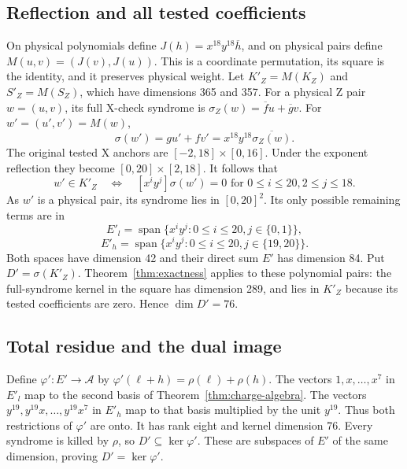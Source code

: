 \documentclass{article}
\DeclareMathOperator{\Span}{span}
\begin{document}
\subsection{Reflection and all tested coefficients}\label{sec:z-reflection}

On physical polynomials define \(J(h) = x^{18} y^{18} \overline{h}\), and on physical pairs
define \(M(u,v) = (J(v), J(u))\). This is a coordinate permutation, its square is the
identity, and it preserves physical weight. Let \(K'_Z = M(K_Z)\) and \(S'_Z = M(S_Z)\),
which have dimensions 365 and 357. For a physical Z pair \(w = (u, v)\), its full X-check
syndrome is \(\sigma_Z(w) = \overline{f} u + \overline{g} v\). For \(w' = (u', v') = M(w)\),
\begin{equation}
  \sigma(w') = gu' + fv' = x^{18} y^{18} \overline{\sigma_Z(w)}.
\end{equation}
The original tested X anchors are \([-2,18] \times [0,16]\). Under the exponent reflection
they become \([0,20] \times [2,18]\). It follows that
\begin{equation}
  w' \in K'_Z \quad \Longleftrightarrow \quad
  [x^i y^j]\sigma(w') = 0
  \text{ for } 0 \le i \le 20, 2 \le j \le 18.
\end{equation}
As \(w'\) is a physical pair, its syndrome lies in \([0,20]^2\). Its only possible remaining
terms are in
\begin{equation}
  E'_l = \Span\{x^i y^j : 0 \le i \le 20, j \in \{0,1\}\},
\end{equation}
\begin{equation}
  E'_h = \Span\{x^i y^j : 0 \le i \le 20, j \in \{19,20\}\}.
\end{equation}
Both spaces have dimension 42 and their direct sum \(E'\) has dimension 84. Put
\(D' = \sigma(K'_Z)\). Theorem~\ref{thm:exactness} applies to these polynomial pairs: the
full-syndrome kernel in the square has dimension 289, and lies in \(K'_Z\) because its
tested coefficients are zero. Hence \(\dim D' = 76\).

\subsection{Total residue and the dual image}\label{sec:z-image}

Define \(\varphi' \colon E' \to \mathcal{A}\) by
\(\varphi'(\ell + h) = \rho(\ell) + \rho(h)\). The vectors \(1, x, \dots, x^7\) in \(E'_l\)
map to the second basis of Theorem~\ref{thm:charge-algebra}. The vectors
\(y^{19}, y^{19} x, \dots, y^{19} x^7\) in \(E'_h\) map to that basis multiplied by the unit
\(y^{19}\). Thus both restrictions of \(\varphi'\) are onto. It has rank eight and kernel
dimension 76. Every syndrome is killed by \(\rho\), so \(D' \subseteq \ker \varphi'\). These
are subspaces of \(E'\) of the same dimension, proving \(D' = \ker \varphi'\).
\end{document}
